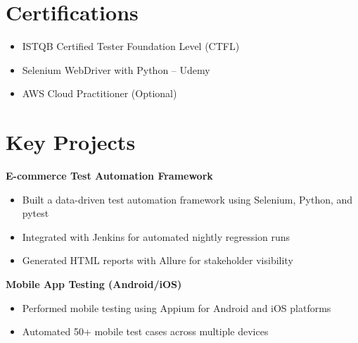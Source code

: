 \documentclass[11pt,a4paper]{article}
\begin{document}
\section{Certifications}
\begin{itemize}[leftmargin=*, nosep]
    \item ISTQB Certified Tester Foundation Level (CTFL)
    \item Selenium WebDriver with Python -- Udemy
    \item AWS Cloud Practitioner (Optional)
\end{itemize}

\section{Key Projects}
\textbf{E-commerce Test Automation Framework}
\begin{itemize}[leftmargin=*, nosep]
    \item Built a data-driven test automation framework using Selenium, Python, and pytest
    \item Integrated with Jenkins for automated nightly regression runs
    \item Generated HTML reports with Allure for stakeholder visibility
\end{itemize}

\vspace{6pt}

\textbf{Mobile App Testing (Android/iOS)}
\begin{itemize}[leftmargin=*, nosep]
    \item Performed mobile testing using Appium for Android and iOS platforms
    \item Automated 50+ mobile test cases across multiple devices
\end{itemize}
\end{document}
